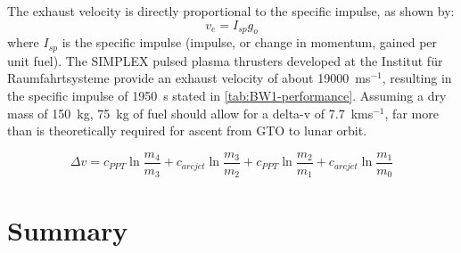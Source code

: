 The exhaust velocity is directly proportional to the specific impulse, as shown by:
\begin{equation}
v_{e}=I_{sp}g_{o}\label{eq:Exhaust_velocity}
\end{equation}
where $I_{sp}$ is the specific impulse (impulse, or change in momentum, gained per unit fuel). The SIMPLEX pulsed plasma thrusters developed at the Institut f\"{u}r Raumfahrtsysteme \parencite{Nawaz2008} provide an exhaust velocity of about 19000~ms$^{-1}$, resulting in the specific impulse of 1950~s stated in \autoref{tab:BW1-performance}. Assuming a dry mass of 150~kg, 75~kg of fuel should allow for a delta-v of 7.7~kms$^{-1}$, far more than is theoretically required for ascent from GTO to lunar orbit.

\begin{equation}
\Delta v= c_{PPT}\ln\frac{m_4}{m_3}+c_{arcjet}\ln\frac{m_3}{m_2}+c_{PPT}\ln\frac{m_2}{m_1}+c_{arcjet}\ln\frac{m_1}{m_0}
\end{equation}


\section{Summary} 

